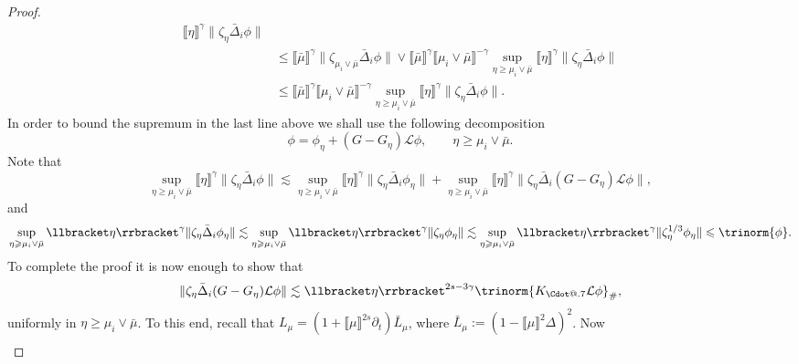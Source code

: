 \documentclass{article}
\makeatletter
\numberwithin{equation}{section}
\newcommand{\assign}{:=}
\newcommand*\Cdot{{\mathpalette\Cdot@{.7}}}
\newcommand*\Cdot@[2]{\mathbin{\vcenter{\hbox{\scalebox{#2}{\hspace{0.1mm}$\m@th#1\bullet$\hspace{0.1mm}}}}}}
\theoremstyle{plain}
\theoremstyle{definition}
\makeatother
\begin{document}
\begin{proof}
\begin{align*}
    \llbracket \eta \rrbracket^{\gamma}  \| \zeta_{\eta} \bar{\Delta}_i  \phi
    \|\\
 &\leqslant  \llbracket \bar{\mu} \rrbracket^{\gamma} \| \zeta_{\mu_i
    \vee \bar{\mu}} \bar{\Delta}_i  \phi \| \vee \llbracket \bar{\mu}
    \rrbracket^{\gamma} \llbracket \mu_i \vee \bar{\mu} \rrbracket^{- \gamma}
    \sup_{\eta \geqslant \mu_i \vee \bar{\mu}}  \llbracket \eta
    \rrbracket^{\gamma}  \| \zeta_{\eta} \bar{\Delta}_i  \phi \|\\
 &\leqslant  \llbracket \bar{\mu} \rrbracket^{\gamma} \llbracket \mu_i
    \vee \bar{\mu} \rrbracket^{- \gamma} \sup_{\eta \geqslant \mu_i \vee
    \bar{\mu}}  \llbracket \eta \rrbracket^{\gamma}  \| \zeta_{\eta}
    \bar{\Delta}_i  \phi \| .
  \end{align*}
  In order to bound the supremum in the last line above we shall use the
  following decomposition
  \[ \phi = \phi_{\eta} + (G - G_{\eta}) \mathcal{L} \phi, \qquad \eta
     \geqslant \mu_i \vee \bar{\mu} . \]
  Note that
  \[ \sup_{\eta \geqslant \mu_i \vee \bar{\mu}}  \llbracket \eta
     \rrbracket^{\gamma}  \| \zeta_{\eta} \bar{\Delta}_i  \phi \| \lesssim
     \sup_{\eta \geqslant \mu_i \vee \bar{\mu}}  \llbracket \eta
     \rrbracket^{\gamma}  \| \zeta_{\eta} \bar{\Delta}_i  \phi_{\eta} \| +
     \sup_{\eta \geqslant \mu_i \vee \bar{\mu}} 
     \llbracket \eta \rrbracket^{\gamma}  \|
     \zeta_{\eta} \bar{\Delta}_i  (G - G_{\eta}) \mathcal{L} \phi \|, \]
  and
  \[ \sup_{\eta \geqslant \mu_i \vee \bar{\mu}}  \llbracket \eta
     \rrbracket^{\gamma}  \| \zeta_{\eta} \bar{\Delta}_i  \phi_{\eta} \|
     \lesssim \sup_{\eta \geqslant \mu_i \vee \bar{\mu}}  \llbracket \eta
     \rrbracket^{\gamma}  \| \zeta_{\eta} \phi_{\eta} \| \lesssim \sup_{\eta
     \geqslant \mu_i \vee \bar{\mu}}  \llbracket \eta \rrbracket^{\gamma}  \|
     \zeta^{1 / 3}_{\eta} \phi_{\eta} \| \leqslant \trinorm{ \phi
     } . \]
  To complete the proof it is now enough to show that
  \begin{equation}
    \| \zeta_{\eta} \bar{\Delta}_i  (G - G_{\eta}) \mathcal{L} \phi \|
    \lesssim \llbracket \eta \rrbracket^{2 s - 3 \gamma}  \trinorm{
    K_{\Cdot} \mathcal{L} \phi }_{\#},
    \label{eq:schauder-proof-bound}
  \end{equation}
  uniformly in $\eta \geqslant \mu_i \vee \bar{\mu}$. To this end, recall that
  $L_{\mu} = {(1 + \llbracket \mu \rrbracket^{2 s} \partial_t) }
  \bar{L}_{\mu}$, where $\bar{L}_{\mu} {\assign } (1 - \llbracket
  \mu \rrbracket^2 \Delta)^2$. Now
  \begin{align*}

\end{align*}
\end{proof}
\end{document}
